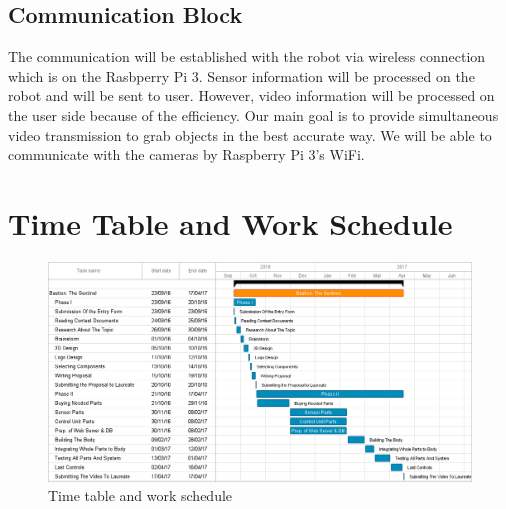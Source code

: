 \documentclass[12pt,a4paper]{article}
\begin{document}
   \subsection{Communication Block}
    \begin{flushleft}
     The communication will be established with the robot via wireless connection which is on the Rasbperry Pi 3. Sensor 
     information will be processed on the robot and will be sent to user. However, video information will be processed on 
     the user side because of the efficiency. Our main goal is to provide simultaneous video transmission to grab 
     objects in the best accurate way. We will be able to communicate with the cameras by Raspberry Pi 3's WiFi.
    \end{flushleft}
 
 \pagebreak
 
 \section{Time Table and Work Schedule}
  \begin{flushleft}
   \begin{figure}[h!]
   \begin{center}
    \includegraphics[scale=0.4]{time_schedule}
    \caption{Time table and work schedule}
   \end{center}
  \end{figure}
  \end{flushleft}
  
\end{document}
